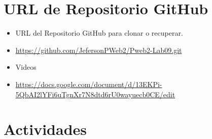 \documentclass{article}
\begin{document}
\section{URL de Repositorio GitHub}
\begin{itemize}
    \item URL del Repositorio GitHub para clonar o recuperar.
    \item \url{https://github.com/JefersonPWeb2/Pweb2-Lab09.git}
     \item Videos
    \item \url{ https://docs.google.com/document/d/13EKPi-5QbAI2lYFi6uTgnXr7N8dtd6rU0wayuecb0CE/edit}
   
    
\end{itemize}
\section{Actividades}
	
\end{document}
